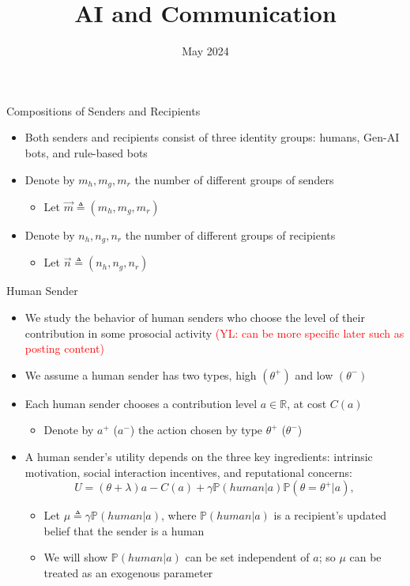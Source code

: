 \documentclass[9pt]{beamer}
\author[Ash, Lou, Song]{%
    \texorpdfstring{%
    \begin{columns}
        \column{.3333\linewidth}
        \centering
        Elliot Ash \\\vspace{.5em} \small ETH Zurich
        \column{.3333\linewidth}
        \centering
        Yichuan Lou \\\vspace{.5em} \small UTokyo
        \column{.3333\linewidth}
        \centering
        Lena Song \\\vspace{.5em} \small UIUC
    \end{columns}}{Elliot Ash, Yichuan Lou, Lena Song}
}
\title[AI and Communication]{AI and Communication}
\date[Conference Name]{May 2024}
\begin{document}
\begin{frame}[plain]
    \titlepage
\end{frame}

\begin{frame}{Compositions of Senders and Recipients}

\begin{itemize}\setlength{\itemsep}{1em}
    \item Both senders and recipients consist of three \textcolor{orange0}{identity} groups: humans, Gen-AI bots, and rule-based bots
    \item Denote by $m_h,m_g,m_r$ the number of different groups of senders 
    \begin{itemize}
        \item Let $\vec{m} \triangleq (m_h,m_g,m_r)$
    \end{itemize}
    \item Denote by $n_h,n_g,n_r$ the number of different groups of recipients
    \begin{itemize}
        \item Let $\vec{n} \triangleq (n_h,n_g,n_r)$
    \end{itemize}
\end{itemize}
\end{frame}

    

\begin{frame}{Human Sender}
\begin{itemize}\setlength{\itemsep}{1em}
    \item We study the behavior of \textcolor{orange0}{human senders} who choose the level of their contribution in some prosocial activity \textcolor{red}{(YL: can be more specific later such as posting content)}
    \item We assume a human sender has two types, high $(\theta^+)$ and low $(\theta^-)$
    \item Each human sender chooses a contribution level $a\in \mathbb{R}$, at cost $C(a)$
    \begin{itemize}
        \item Denote by $a^+$ ($a^-$) the action chosen by type $\theta^+$ ($\theta^-$)
    \end{itemize}
    \item A human sender's utility depends on the three key ingredients: intrinsic motivation, social interaction incentives, and reputational concerns:
    \begin{equation*}
        U = (\theta + \lambda )a - C(a) + \gamma \mathbb{P}(human|a)\mathbb{P}(\theta=\theta^+|a),
    \end{equation*}
    \begin{itemize}
        \item Let $\mu\triangleq \gamma \mathbb{P}(human|a)$, where $\mathbb{P}(human|a)$ is a recipient's updated belief that the sender is a human
        \item We will show $\mathbb{P}(human|a)$ can be set independent of $a$; so $\mu$ can be treated as an exogenous parameter
    \end{itemize}
\end{itemize}
\end{frame}
\end{document}
